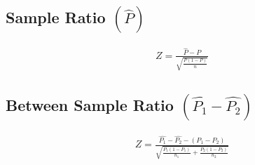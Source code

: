 \documentclass[twocolumn]{article}
\begin{document}
\subsection{Sample Ratio $(\hat{P})$}
\begin{align*}
    Z = \frac{\hat{P} - P}{\sqrt{\frac{P(1-P)}{n}}}
\end{align*}
\subsection{Between Sample Ratio $(\hat{P_{1}} - \hat{P_{2}})$}
\begin{align*}
    Z = \frac{\hat{P_{1}} - \hat{P_{2}} - (P_{1} - P_{2})}{\sqrt{\frac{P_{1}(1-P_{1})}{n_{1}} + \frac{P_{2}(1-P_{2})}{n_{2}}}}
\end{align*}
\end{document}
